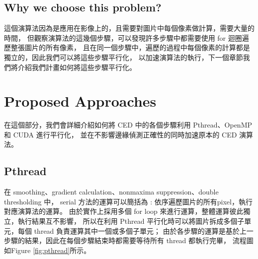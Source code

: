 \documentclass[sigconf,nonacm]{acmart}
\begin{document}
\subsection{Why we choose this problem?}

這個演算法因為是應用在影像上的，且需要對圖片中每個像素做計算，需要大量的時間，
但觀察演算法的這幾個步驟，可以發現許多步驟中都需要使用 for 迴圈遍歷整張圖片的所有像素，
且在同一個步驟中，遍歷的過程中每個像素的計算都是獨立的，因此我們可以將這些步驟平行化，
以加速演算法的執行，下一個章節我們將介紹我們計畫如何將這些步驟平行化。

\section{Proposed Approaches}

在這個部分，我們會詳細介紹如何將 CED 中的各個步驟利用 Pthread、OpenMP 和 CUDA 進行平行化，
並在不影響邊緣偵測正確性的同時加速原本的 CED 演算法。

\subsection{Pthread}

在 smoothing、gradient calculation、nonmaxima suppression、double thresholding 中，
serial 方法的運算可以簡括為 : 依序遍歷圖片的所有pixel，執行對應演算法的運算。
由於實作上採用多個 for loop 來進行運算，整體運算彼此獨立，執行結果互不影響，
所以在利用 Pthread 平行化時可以將圖片拆成多個子單元，每個 thread 負責運算其中一個或多個子單元；
由於各步驟的運算是基於上一步驟的結果，因此在每個步驟結束時都需要等待所有 thread 都執行完畢，
流程圖如Figure \ref{fig:pthread}所示。
\end{document}
